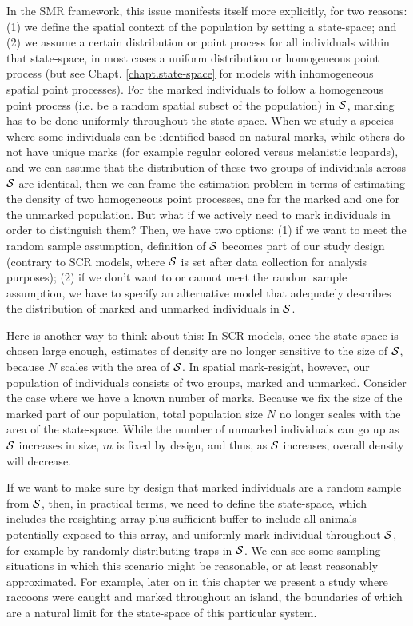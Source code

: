 In the SMR framework, this issue manifests itself more explicitly, for
two reasons: (1) we define the spatial context of the population by
setting a state-space; and (2) we assume a certain distribution or
point process for all individuals within that state-space, in most
cases a uniform distribution or homogeneous point process (but see
Chapt. \ref{chapt.state-space} for models with inhomogeneous spatial
point processes). For the marked individuals to follow a homogeneous point process (i.e. be a random spatial
subset 
of the population) in ${\cal S}$, marking has to be done uniformly throughout the state-space. 
When we study a species where some
individuals can be identified based on natural marks, while others do
not have unique marks (for example regular colored versus melanistic
leopards), and we can assume that the distribution of these two groups
of individuals across ${\cal S}$ are identical, then we can frame the
estimation problem in terms of estimating the density of two
homogeneous point processes, one for the marked and one for the unmarked
population.
But what if we actively need to mark
individuals in order to distinguish them?  Then, we have two options: (1) if we want to meet
the random sample assumption, definition of ${\cal S}$ becomes
part of our study design (contrary to SCR models, where ${\cal S}$ is set after data collection for analysis
purposes); (2) if we don't want to or cannot meet the random sample assumption, we have to specify an alternative model that adequately describes the distribution of marked and unmarked individuals in ${\cal S}$.

Here is another way to think about this: In SCR models, once the
state-space is chosen large enough, estimates of density are no longer
sensitive to the size of ${\cal S}$, because $N$ scales with the area
of ${\cal S}$. In spatial mark-resight, however, our population of
individuals consists of two groups, marked and unmarked. Consider the
case where we have a known number of marks. Because we fix the size of
the marked part of our population, total population size $N$ no longer
scales with the area of the state-space. While the number of unmarked
individuals can go up as ${\cal S}$ increases in size, $m$ is fixed by
design, and thus, as ${\cal S}$ increases, overall density will
decrease. 

If we want to make sure by design that marked individuals are a
random sample from ${\cal S}$, then, in practical terms, we need to
define the state-space, which includes the resighting array plus
sufficient buffer to include all animals potentially exposed to this
array, and uniformly mark individual throughout ${\cal
  S}$, for example by randomly distributing traps in ${\cal
  S}$. We can see some sampling situations in which this
scenario might be reasonable, or at least reasonably
approximated. For example, later on in this chapter we present a study
where raccoons were caught and marked throughout an island, the
boundaries of which are a natural limit for the state-space of this
particular system. 

